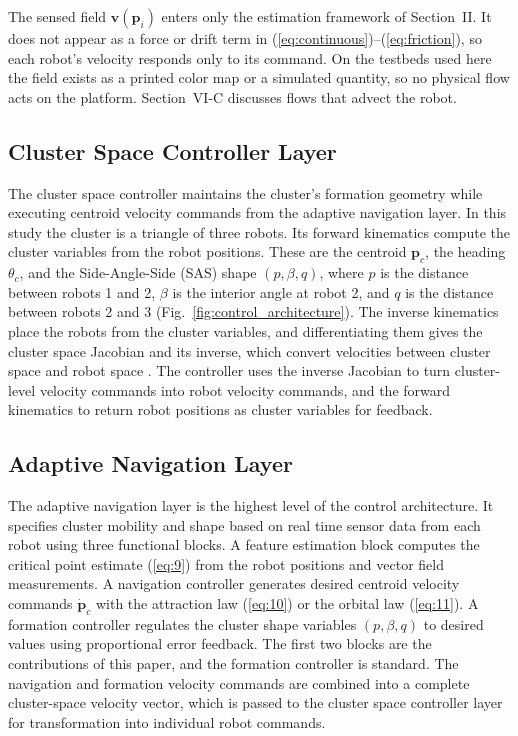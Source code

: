 \documentclass[lettersize,journal]{IEEEtran}
\begin{document}
The sensed field $\mathbf{v}(\mathbf{p}_i)$ enters only the estimation framework of Section~II. It does not appear as a force or drift term in (\ref{eq:continuous})--(\ref{eq:friction}), so each robot's velocity responds only to its command. On the testbeds used here the field exists as a printed color map or a simulated quantity, so no physical flow acts on the platform. Section~VI-C discusses flows that advect the robot.

\subsection{Cluster Space Controller Layer}

The cluster space controller maintains the cluster's formation geometry while executing centroid velocity commands from the adaptive navigation layer. In this study the cluster is a triangle of three robots. Its forward kinematics compute the cluster variables from the robot positions. These are the centroid $\mathbf{p}_c$, the heading $\theta_c$, and the Side-Angle-Side (SAS) shape $(p, \beta, q)$, where $p$ is the distance between robots 1 and 2, $\beta$ is the interior angle at robot 2, and $q$ is the distance between robots 2 and 3 (Fig.~\ref{fig:control_architecture}). The inverse kinematics place the robots from the cluster variables, and differentiating them gives the cluster space Jacobian and its inverse, which convert velocities between cluster space and robot space \cite{50}. The controller uses the inverse Jacobian to turn cluster-level velocity commands into robot velocity commands, and the forward kinematics to return robot positions as cluster variables for feedback.

\subsection{Adaptive Navigation Layer}

The adaptive navigation layer is the highest level of the control architecture. It specifies cluster mobility and shape based on real time sensor data from each robot using three functional blocks. A feature estimation block computes the critical point estimate (\ref{eq:9}) from the robot positions and vector field measurements. A navigation controller generates desired centroid velocity commands $\dot{\mathbf{p}}_c$ with the attraction law (\ref{eq:10}) or the orbital law (\ref{eq:11}). A formation controller regulates the cluster shape variables $(p, \beta, q)$ to desired values using proportional error feedback. The first two blocks are the contributions of this paper, and the formation controller is standard. The navigation and formation velocity commands are combined into a complete cluster-space velocity vector, which is passed to the cluster space controller layer for transformation into individual robot commands.
\end{document}
